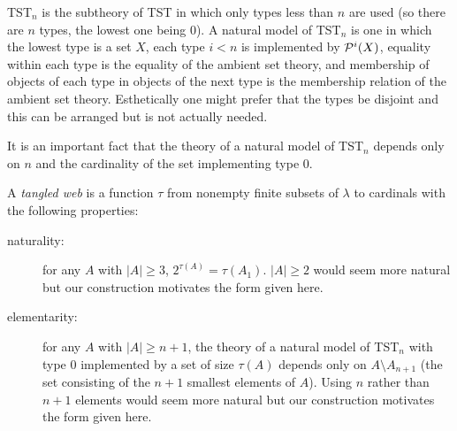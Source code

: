 \documentclass{slides}
\begin{document}
\begin{slide}

TST$_n$ is the subtheory of TST in which only types less than $n$ are used (so there are $n$ types, the lowest one being 0).  A natural model of TST$_n$ is one in which
the lowest type is a set $X$, each type $i<n$ is implemented by ${\cal P}^i(X)$, equality within each type is the equality of the ambient set theory, and membership of objects
of each type in objects of the next type is the membership relation of the ambient set theory.  Esthetically one might prefer that the types be disjoint and this can be arranged but is not actually needed.

It is an important fact that the theory of a natural model of TST$_n$ depends only on $n$ and the cardinality of the set implementing type 0.

\end{slide}

\begin{slide}

A {\em tangled web\/} is a function $\tau$ from nonempty finite subsets of $\lambda$ to cardinals with the following properties:

\begin{description}

\item[naturality:]  for any $A$ with $|A|\geq 3$, $2^{\tau(A)} = \tau(A_1)$.  $|A|\geq 2$ would seem more natural but our construction motivates the form given here.

\item[elementarity:]   for any $A$ with $|A|\geq  n+1$, the theory of a natural model of TST$_n$ with type 0 implemented by a set of size $\tau(A)$ depends only on  $A \setminus A_{n+1}$ (the set
consisting of the $n+1$ smallest elements of $A$).  Using $n$ rather than $n+1$ elements would seem more natural but our construction motivates the form given here.

\end{description}


\end{slide}
\end{document}
